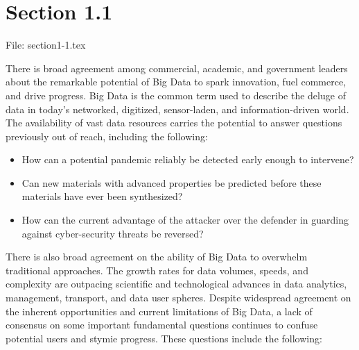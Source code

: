 \section{Section 1.1}

File: section1-1.tex

There is broad agreement among commercial, academic, and government leaders about the remarkable potential of Big Data to spark innovation, fuel commerce, and drive progress. Big Data is the common term used to describe the deluge of data in today's networked, digitized, sensor-laden, and information-driven world. The availability of vast data resources carries the potential to answer questions previously out of reach, including the following:

\begin{itemize}
\item	How can a potential pandemic reliably be detected early enough to intervene? 
\item	Can new materials with advanced properties be predicted before these materials have ever been synthesized? 
\item	How can the current advantage of the attacker over the defender in guarding against cyber-security threats be reversed? 
\end{itemize}

There is also broad agreement on the ability of Big Data to overwhelm traditional approaches. The growth rates for data volumes, speeds, and complexity are outpacing scientific and technological advances in data analytics, management, transport, and data user spheres. 
Despite widespread agreement on the inherent opportunities and current limitations of Big Data, a lack of consensus on some important fundamental questions continues to confuse potential users and stymie progress. These questions include the following: 

